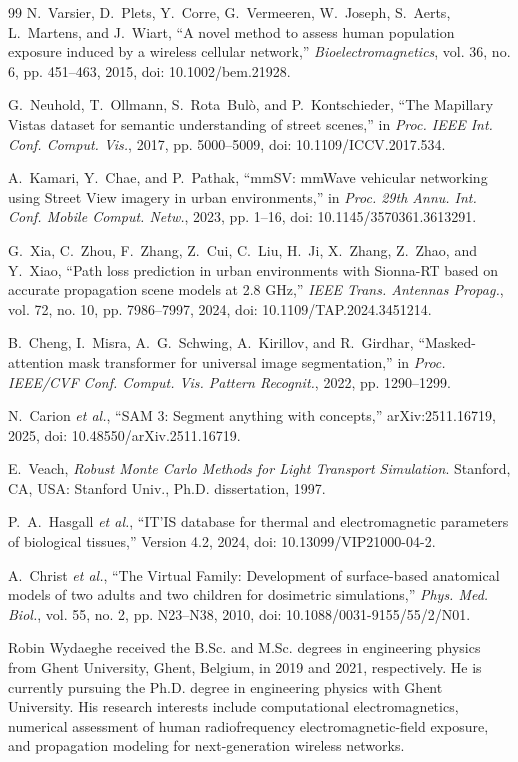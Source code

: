 \documentclass{ieeeaccess}
\begin{document}
\begin{thebibliography}{99}
N.~Varsier, D.~Plets, Y.~Corre, G.~Vermeeren, W.~Joseph, S.~Aerts, L.~Martens,
and J.~Wiart, ``A novel method to assess human population exposure induced by a
wireless cellular network,'' \emph{Bioelectromagnetics}, vol. 36, no. 6,
pp. 451--463, 2015, doi: 10.1002/bem.21928.

G.~Neuhold, T.~Ollmann, S.~Rota~Bul\`o, and P.~Kontschieder,
``The Mapillary Vistas dataset for semantic understanding of street scenes,''
in \emph{Proc. IEEE Int. Conf. Comput. Vis.}, 2017, pp. 5000--5009,
doi: 10.1109/ICCV.2017.534.

A.~Kamari, Y.~Chae, and P.~Pathak, ``mmSV: mmWave vehicular networking using
Street View imagery in urban environments,'' in \emph{Proc. 29th Annu. Int.
Conf. Mobile Comput. Netw.}, 2023, pp. 1--16,
doi: 10.1145/3570361.3613291.

G.~Xia, C.~Zhou, F.~Zhang, Z.~Cui, C.~Liu, H.~Ji, X.~Zhang, Z.~Zhao, and
Y.~Xiao, ``Path loss prediction in urban environments with Sionna-RT based on
accurate propagation scene models at 2.8 GHz,'' \emph{IEEE Trans. Antennas
Propag.}, vol. 72, no. 10, pp. 7986--7997, 2024,
doi: 10.1109/TAP.2024.3451214.

B.~Cheng, I.~Misra, A.~G.~Schwing, A.~Kirillov, and R.~Girdhar,
``Masked-attention mask transformer for universal image segmentation,'' in
\emph{Proc. IEEE/CVF Conf. Comput. Vis. Pattern Recognit.}, 2022,
pp. 1290--1299.

N.~Carion \emph{et al.}, ``SAM 3: Segment anything with concepts,''
arXiv:2511.16719, 2025, doi: 10.48550/arXiv.2511.16719.

E.~Veach, \emph{Robust Monte Carlo Methods for Light Transport Simulation}.
Stanford, CA, USA: Stanford Univ., Ph.D. dissertation, 1997.

P.~A.~Hasgall \emph{et al.}, ``IT'IS database for thermal and electromagnetic
parameters of biological tissues,'' Version 4.2, 2024,
doi: 10.13099/VIP21000-04-2.

A.~Christ \emph{et al.}, ``The Virtual Family: Development of surface-based
anatomical models of two adults and two children for dosimetric simulations,''
\emph{Phys. Med. Biol.}, vol. 55, no. 2, pp. N23--N38, 2010,
doi: 10.1088/0031-9155/55/2/N01.

\end{thebibliography}

\begin{IEEEbiographynophoto}{Robin Wydaeghe}
received the B.Sc. and M.Sc. degrees in engineering physics from Ghent
University, Ghent, Belgium, in 2019 and 2021, respectively. He is currently
pursuing the Ph.D. degree in engineering physics with Ghent University. His
research interests include computational electromagnetics, numerical assessment
of human radiofrequency electromagnetic-field exposure, and propagation
modeling for next-generation wireless networks.
\end{IEEEbiographynophoto}
\end{document}
